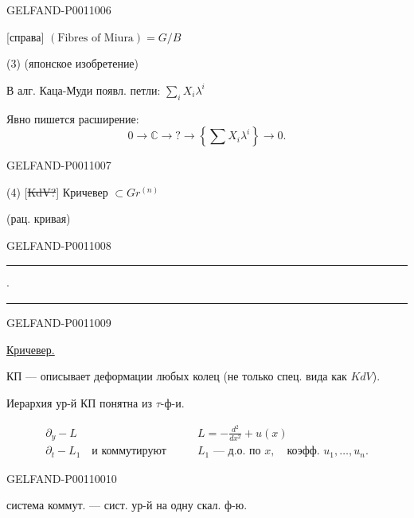 \begin{GelfandAdjacentEvidence}{GELFAND-P001100}{6}

[справа] $(\text{Fibres of Miura})=G/B$

(3)  (японское изобретение)


В алг. Каца-Муди появл. петли: $\displaystyle\sum_i X_i\lambda^i$

Явно пишется расширение:
\[
0\to\mathbb C\to ?\to\left\{\sum X_i\lambda^i\right\}\to0.
\]
\end{GelfandAdjacentEvidence}
\begin{GelfandAdjacentEvidence}{GELFAND-P001100}{7}


(4) [\sout{KdV?}] Кричевер $\subset Gr^{(n)}$

(рац. кривая)
\end{GelfandAdjacentEvidence}
\begin{GelfandAdjacentEvidence}{GELFAND-P001100}{8}


\begin{center}\rule{12mm}{0.3pt}\quad $\cdot$\quad\rule{12mm}{0.3pt}\end{center}
\end{GelfandAdjacentEvidence}
\begin{GelfandAdjacentEvidence}{GELFAND-P001100}{9}


\underline{Кричевер.}

КП — описывает деформации любых колец (не только спец. вида как $KdV$).

Иерархия ур-й КП понятна из $\tau$-ф-и.

\[
\begin{aligned}
\partial_y-L &\qquad L=-\frac{d^2}{dx^2}+u(x)\\
\partial_t-L_1\quad\text{и коммутируют}
 &\qquad L_1\text{ — д.о. по }x,\quad\text{коэфф. }u_1,\ldots,u_n.
\end{aligned}
\]
\end{GelfandAdjacentEvidence}
\begin{GelfandAdjacentEvidence}{GELFAND-P001100}{10}


 система коммут. — сист. ур-й на одну скал. ф-ю.
\end{GelfandAdjacentEvidence}
